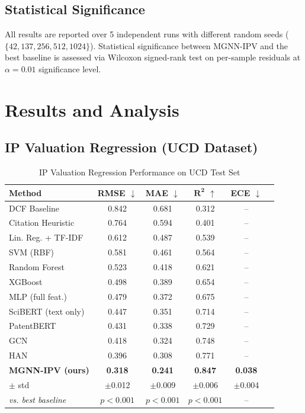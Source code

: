 \documentclass[journal]{IEEEtran}
\begin{document}
\subsection{Statistical Significance}

All results are reported over 5 independent runs with different random seeds ($\{42, 137, 256, 512, 1024\}$). Statistical significance between MGNN-IPV and the best baseline is assessed via Wilcoxon signed-rank test \cite{wilcoxon1945} on per-sample residuals at $\alpha = 0.01$ significance level.

\section{Results and Analysis}

\subsection{IP Valuation Regression (UCD Dataset)}

\begin{table}[h]
\centering
\caption{IP Valuation Regression Performance on UCD Test Set}
\label{tab:regression}
\begin{tabular}{lccccc}
\toprule
\textbf{Method} & \textbf{RMSE} $\downarrow$ & \textbf{MAE} $\downarrow$ & $\bm{R^2}$ $\uparrow$ & \textbf{ECE} $\downarrow$ \\
\midrule
DCF Baseline & 0.842 & 0.681 & 0.312 & -- \\
Citation Heuristic & 0.764 & 0.594 & 0.401 & -- \\
Lin. Reg. + TF-IDF & 0.612 & 0.487 & 0.539 & -- \\
SVM (RBF) & 0.581 & 0.461 & 0.564 & -- \\
Random Forest & 0.523 & 0.418 & 0.621 & -- \\
XGBoost & 0.498 & 0.389 & 0.654 & -- \\
MLP (full feat.) & 0.479 & 0.372 & 0.675 & -- \\
SciBERT (text only) & 0.447 & 0.351 & 0.714 & -- \\
PatentBERT & 0.431 & 0.338 & 0.729 & -- \\
GCN & 0.418 & 0.324 & 0.748 & -- \\
HAN & 0.396 & 0.308 & 0.771 & -- \\
\midrule
\textbf{MGNN-IPV (ours)} & \textbf{0.318} & \textbf{0.241} & \textbf{0.847} & \textbf{0.038} \\
\quad $\pm$ std & $\pm$0.012 & $\pm$0.009 & $\pm$0.006 & $\pm$0.004 \\
\textit{vs. best baseline} & $p<0.001$ & $p<0.001$ & $p<0.001$ & -- \\
\bottomrule
\end{tabular}
\end{table}
\end{document}
